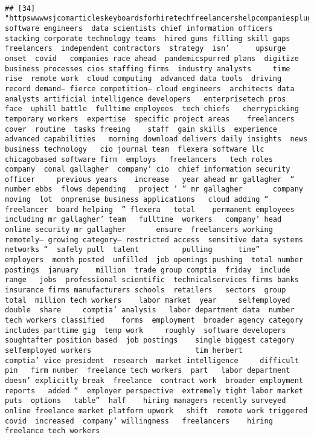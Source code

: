 \documentclass[
]{article}
\begin{document}
\begin{verbatim}
                                                                                                                                                                                                                                                                                                                                                                                                                                                                                                    
## [34] "httpswwwwsjcomarticleskeyboardsforhiretechfreelancershelpcompaniesplugtalentgaps  software engineers  data scientists chief information officers  stacking corporate technology teams  hired guns filling skill gaps  freelancers  independent contractors  strategy  isn’      upsurge   onset  covid   companies race ahead  pandemicspurred plans  digitize  business processes cios staffing firms  industry analysts     time    rise  remote work  cloud computing  advanced data tools  driving record demand— fierce competition— cloud engineers  architects data analysts artificial intelligence developers   enterprisetech pros   face  uphill battle  fulltime employees  tech chiefs   cherrypicking temporary workers  expertise  specific project areas    freelancers  cover  routine  tasks freeing    staff  gain skills  experience  advanced capabilities   morning download delivers daily insights  news  business technology   cio journal team  flexera software llc  chicagobased software firm  employs   freelancers   tech roles   company  conal gallagher  company’ cio  chief information security officer     previous years    increase   year ahead mr gallagher  “ number ebbs  flows depending   project ’ ” mr gallagher       company  moving  lot  onpremise business applications   cloud adding “   freelancer  board helping  ” flexera   total    permanent employees including mr gallagher’ team   fulltime  workers   company’ head  online security mr gallagher       ensure  freelancers working remotely— growing category— restricted access  sensitive data systems  networks “  safely pull  talent          pulling      time”    employers  month posted  unfilled  job openings pushing  total number  postings  january    million  trade group comptia  friday  include  range   jobs  professional scientific  technicalservices firms banks  insurance firms manufacturers schools  retailers   sectors  group    total  million tech workers    labor market  year     selfemployed     double  share     comptia’ analysis   labor department data  number  tech workers classified    forms  employment  broader agency category  includes parttime gig  temp work     roughly  software developers     soughtafter position based  job postings    single biggest category  selfemployed workers                        tim herbert          comptia’ vice president  research  market intelligence     difficult  pin   firm number  freelance tech workers  part   labor department doesn’ explicitly break  freelance  contract work  broader employment reports   added “  employer perspective  extremely tight labor market puts  options   table”  half    hiring managers recently surveyed  online freelance market platform upwork   shift  remote work triggered  covid  increased  company’ willingness   freelancers    hiring freelance tech workers 
\end{verbatim}
\end{document}
